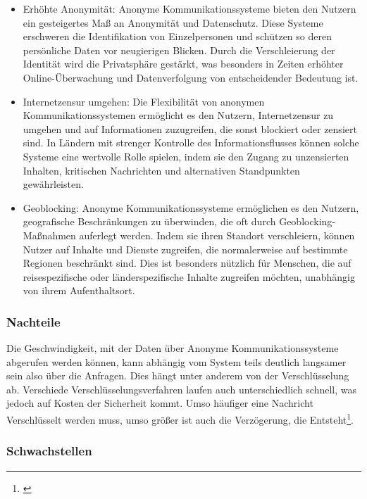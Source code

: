 \begin{itemize}

\item Erhöhte Anonymität: Anonyme Kommunikationssysteme bieten den Nutzern ein gesteigertes Maß an Anonymität und Datenschutz. Diese Systeme erschweren die Identifikation von Einzelpersonen und schützen so deren persönliche Daten vor neugierigen Blicken. Durch die Verschleierung der Identität wird die Privatsphäre gestärkt, was besonders in Zeiten erhöhter Online-Überwachung und Datenverfolgung von entscheidender Bedeutung ist.

\item Internetzensur umgehen: Die Flexibilität von anonymen Kommunikationssystemen ermöglicht es den Nutzern, Internetzensur zu umgehen und auf Informationen zuzugreifen, die sonst blockiert oder zensiert sind. In Ländern mit strenger Kontrolle des Informationsflusses können solche Systeme eine wertvolle Rolle spielen, indem sie den Zugang zu unzensierten Inhalten, kritischen Nachrichten und alternativen Standpunkten gewährleisten.

\item Geoblocking: Anonyme Kommunikationssysteme ermöglichen es den Nutzern, geografische Beschränkungen zu überwinden, die oft durch Geoblocking-Maßnahmen auferlegt werden. Indem sie ihren Standort verschleiern, können Nutzer auf Inhalte und Dienste zugreifen, die normalerweise auf bestimmte Regionen beschränkt sind. Dies ist besonders nützlich für Menschen, die auf reisespezifische oder länderspezifische Inhalte zugreifen möchten, unabhängig von ihrem Aufenthaltsort.

\end{itemize}

\subsubsection{Nachteile}

Die Geschwindigkeit, mit der Daten über Anonyme Kommunikationssysteme abgerufen werden können, kann abhängig vom System teils deutlich langsamer sein also über die Anfragen. Dies hängt unter anderem von der Verschlüsselung ab. Verschiede Verschlüsselungsverfahren laufen auch unterschiedlich schnell, was jedoch auf Kosten der Sicherheit kommt. Umso häufiger eine Nachricht Verschlüsselt werden muss, umso größer ist auch die Verzögerung, die Entsteht\footnote{\cite{EffectivenessOfMixnets}}.

\subsubsection{Schwachstellen}

